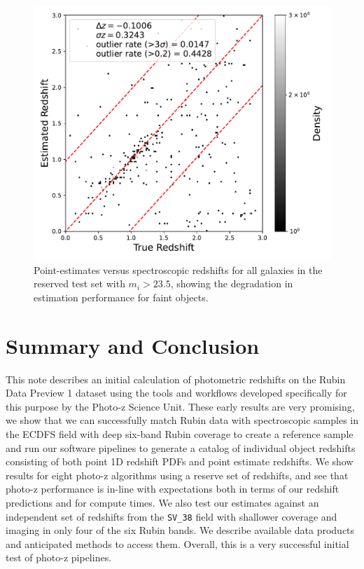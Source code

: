 \begin{figure}
    \centering
    \includegraphics[width=0.45\linewidth]{figures/tpz_scatter_faint.pdf}
    \caption{Point-estimates versus spectroscopic redshifts for all galaxies in the reserved test set with $m_{i} > 23.5$, showing the degradation in estimation performance for faint objects.}
    \label{fig:faint_objects}
\end{figure}


\section{Summary and Conclusion}
\label{sec:summary:0}

This note describes an initial calculation of photometric redshifts on the Rubin Data Preview 1 dataset using the tools and workflows developed specifically for this purpose by the Photo-z Science Unit.  These early results are very promising, we show that we can successfully match Rubin data with spectroscopic samples in the ECDFS field with deep six-band Rubin coverage to create a reference sample and run our software pipelines to generate a catalog of individual object redshifts consisting of both point 1D redshift PDFs and point estimate redshifts.  We show results for eight photo-z algorithms using a reserve set of redshifts, and see that photo-z performance is in-line with expectations both in terms of our redshift predictions and for compute times.  We also test our estimates against an independent set of redshifts from the \texttt{SV\_38} field with shallower coverage and imaging in only four of the six Rubin bands.  We describe available data products and anticipated methods to access them.  Overall, this is a very successful initial test of photo-z pipelines.

